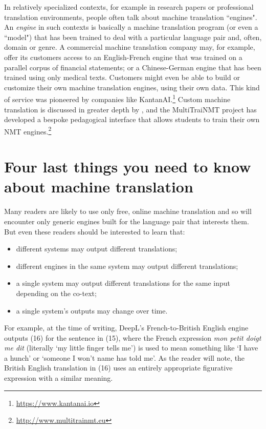 \documentclass[output=paper]{langscibook}
\begin{document}
In relatively specialized contexts, for example in research papers or professional translation environments, people often talk about machine translation “engines". An \textit{engine} in such contexts is basically a machine translation program (or even a “model") that has been trained to deal with a particular language pair and, often, domain or genre. A commercial machine translation company may, for example, offer its customers access to an English-French engine that was trained on a parallel corpus of financial statements; or a Chinese-German engine that has been trained using only medical texts. Customers might even be able to build or customize their own machine translation engines, using their own data. This kind of service was pioneered by companies like KantanAI.\footnote{\url{https://www.kantanai.io}} Custom machine translation is discussed in greater depth by , and the MultiTraiNMT project has developed a bespoke pedagogical interface that allows students to train their own NMT engines.\footnote{\url{http://www.multitrainmt.eu}}

\section {Four last things you need to know about machine translation}
Many readers are likely to use only free, online machine translation and so will encounter only generic engines built for the language pair that interests them. But even these readers should be interested to learn that:

\begin{itemize}
    \item different systems may output different translations;
    \item different engines in the same system may output different translations;
    \item a single system may output different translations for the same input depending on the co-text;
    \item a single system's outputs may change over time.
\end{itemize}

For example, at the time of writing, DeepL's French-to-British English engine outputs (16) for the sentence in (15), where the French expression \textit{mon petit doigt me dit} (literally ‘my little finger tells me') is used to mean something like ‘I have a hunch' or ‘someone I won't name has told me'.  As the reader will note, the British English translation in (16) uses an entirely appropriate figurative expression with a similar meaning.  
\end{document}
